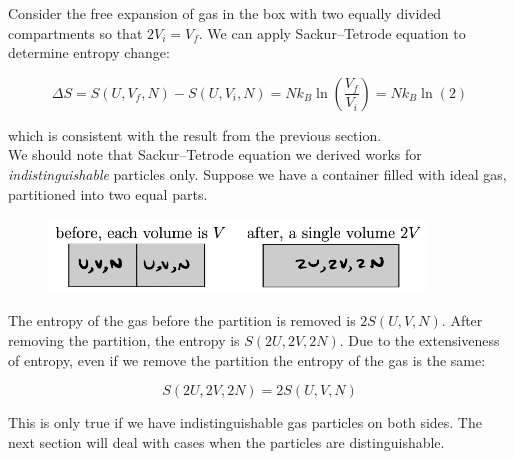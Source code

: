 Consider the free expansion of gas in the box with two equally divided compartments so that $2V_i=V_f$. We can apply Sackur–Tetrode equation to determine entropy change:

\[\Delta S=S(U,V_f,N)-S(U,V_i,N)=Nk_B\ln\left(\frac{V_f}{V_i}\right)=Nk_B\ln(2)\]

which is consistent with the result from the previous section. \\

We should note that Sackur–Tetrode equation we derived works for \textit{indistinguishable} particles only. Suppose we have a container filled with ideal gas, partitioned into two equal parts.

\begin{figure}[H]
	\centering
	\includegraphics[width=100mm]{37.png}
\end{figure}

The entropy of the gas before the partition is removed is $2S(U,V,N)$. After removing the partition, the entropy is $S(2U,2V,2N)$. Due to the extensiveness of entropy, even if we remove the partition the entropy of the gas is the same:

\[S(2U,2V,2N)=2S(U,V,N)\]

This is only true if we have indistinguishable gas particles on both sides. The next section will deal with cases when the particles are distinguishable.

